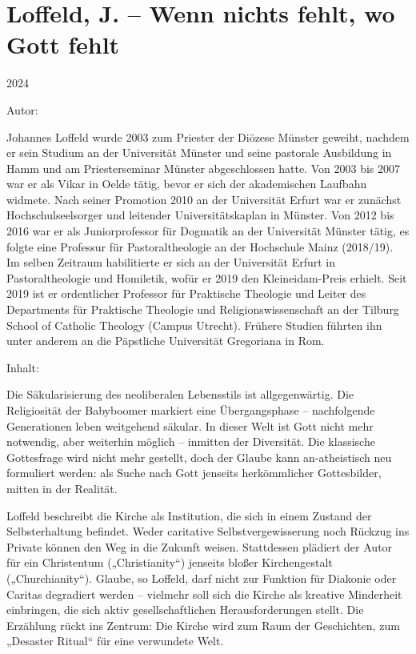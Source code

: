 \documentclass[
]{article}
\begin{document}
\section{\texorpdfstring{Loffeld, J. -- Wenn nichts fehlt, wo Gott fehlt }{Loffeld, J. -- Wenn nichts fehlt, wo Gott fehlt }}\label{loffeld-j.-wenn-nichts-fehlt-wo-gott-fehlt}

2024

Autor:

Johannes Loffeld wurde 2003 zum Priester der Diözese Münster geweiht, nachdem er sein Studium an der Universität Münster und seine pastorale Ausbildung in Hamm und am Priesterseminar Münster abgeschlossen hatte. Von 2003 bis 2007 war er als Vikar in Oelde tätig, bevor er sich der akademischen Laufbahn widmete. Nach seiner Promotion 2010 an der Universität Erfurt war er zunächst Hochschulseelsorger und leitender Universitätskaplan in Münster. Von 2012 bis 2016 war er als Juniorprofessor für Dogmatik an der Universität Münster tätig, es folgte eine Professur für Pastoraltheologie an der Hochschule Mainz (2018/19). Im selben Zeitraum habilitierte er sich an der Universität Erfurt in Pastoraltheologie und Homiletik, wofür er 2019 den Kleineidam-Preis erhielt. Seit 2019 ist er ordentlicher Professor für Praktische Theologie und Leiter des Departments für Praktische Theologie und Religionswissenschaft an der Tilburg School of Catholic Theology (Campus Utrecht). Frühere Studien führten ihn unter anderem an die Päpstliche Universität Gregoriana in Rom.

Inhalt:

Die Säkularisierung des neoliberalen Lebensstils ist allgegenwärtig. Die Religiosität der Babyboomer markiert eine Übergangsphase -- nachfolgende Generationen leben weitgehend säkular. In dieser Welt ist Gott nicht mehr notwendig, aber weiterhin möglich -- inmitten der Diversität. Die klassische Gottesfrage wird nicht mehr gestellt, doch der Glaube kann an-atheistisch neu formuliert werden: als Suche nach Gott jenseits herkömmlicher Gottesbilder, mitten in der Realität.

Loffeld beschreibt die Kirche als Institution, die sich in einem Zustand der Selbsterhaltung befindet. Weder caritative Selbstvergewisserung noch Rückzug ins Private können den Weg in die Zukunft weisen. Stattdessen plädiert der Autor für ein Christentum („Christianity``) jenseits bloßer Kirchengestalt („Churchianity``). Glaube, so Loffeld, darf nicht zur Funktion für Diakonie oder Caritas degradiert werden -- vielmehr soll sich die Kirche als kreative Minderheit einbringen, die sich aktiv gesellschaftlichen Herausforderungen stellt. Die Erzählung rückt ins Zentrum: Die Kirche wird zum Raum der Geschichten, zum „Desaster Ritual`` für eine verwundete Welt.
\end{document}
